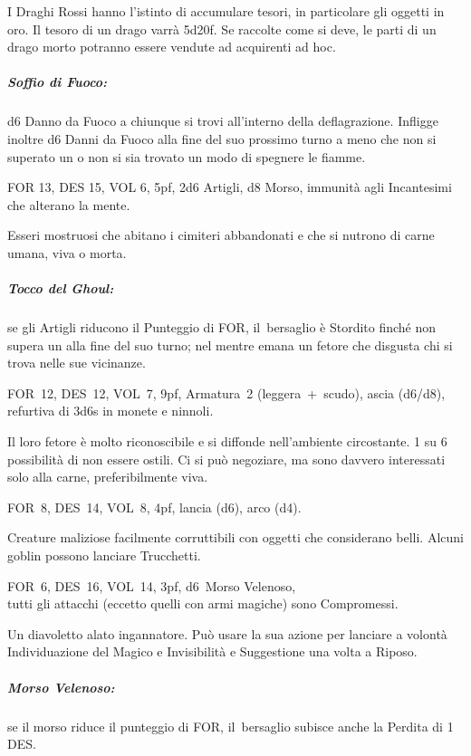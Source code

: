\documentclass[itdr]{subfiles}
\begin{document}
I Draghi Rossi hanno l'istinto di accumulare tesori, in particolare gli oggetti in oro. Il tesoro di un drago varrà 5d20f. Se raccolte come si deve, le parti di un drago morto potranno essere vendute ad acquirenti ad hoc.

\subparagraph{Soffio di Fuoco:} d6 Danno da Fuoco a chiunque si trovi all'interno della deflagrazione. Infligge inoltre d6 Danni da Fuoco alla fine del suo prossimo turno a meno che non si superato un  o non si sia trovato un modo di spegnere le fiamme.

\vfill

FOR 13, DES 15, VOL 6, 5pf, 2d6 Artigli, d8 Morso, \mbox{immunità} agli Incantesimi che alterano la mente.

Esseri mostruosi che abitano i cimiteri abbandonati e che si nutrono di carne umana, viva o morta.

\subparagraph{Tocco del Ghoul:} se gli Artigli riducono il Punteggio di FOR, \mbox{il bersaglio} è Stordito finché non supera un  alla fine del suo turno; nel mentre emana un fetore che disgusta chi si trova nelle sue vicinanze.

\vfill

FOR~12, DES~12, VOL~7, 9pf, Armatura~2 \mbox{(leggera + scudo),} ascia (d6/d8), refurtiva di 3d6s in monete e ninnoli.

Il loro fetore è molto riconoscibile e si diffonde nell'ambiente circostante.
1 su 6 possibilità di non essere ostili. Ci si può negoziare, ma sono davvero interessati solo alla carne, preferibilmente viva.

\vfill

FOR~8, DES~14, VOL~8, 4pf, lancia (d6), arco (d4).

Creature maliziose facilmente corruttibili con oggetti che considerano belli. Alcuni goblin possono lanciare Trucchetti.

\vfill

FOR~6, DES~16, VOL~14, 3pf, d6~Morso Velenoso,\\tutti gli attacchi (eccetto quelli con armi magiche) sono Compromessi.

Un diavoletto alato ingannatore. Può usare la sua azione per lanciare a volontà Individuazione del Magico e Invisibilità e Suggestione una volta a Riposo.

\subparagraph{Morso Velenoso:} se il morso riduce il punteggio di FOR, \mbox{il bersaglio} subisce anche la Perdita di 1 DES.
\end{document}
